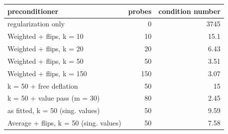 \begin{tabular}{l r r}
\hline
preconditioner & probes & condition number \\
\hline
regularization only & 0 & 3745 \\
Weighted + flips, k = 10 & 10 & 15.1 \\
Weighted + flips, k = 20 & 20 & 6.43 \\
Weighted + flips, k = 50 & 50 & 3.51 \\
Weighted + flips, k = 150 & 150 & 3.07 \\
k = 50 + free deflation & 50 & 15 \\
k = 50 + value pass (m = 30) & 80 & 2.45 \\
as fitted, k = 50 (sing. values) & 50 & 9.59 \\
Average + flips, k = 50 (sing. values) & 50 & 7.58 \\
\hline
\end{tabular}
